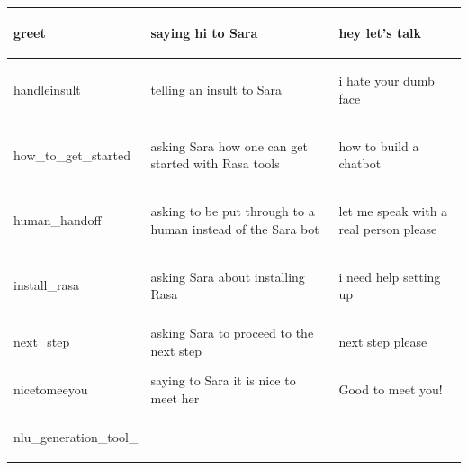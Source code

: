 \documentclass[bsc,frontabs,singlespacing,parskip,deptreport]{infthesis}
\begin{document}
{\begin{center}
\begin{longtable}{p{}|p{}|p{}}
    \hline
    \begin{spverbatim}greet\end{spverbatim} & saying hi to Sara & \begin{spverbatim}hey let's talk\end{spverbatim} \\
    \hline
    \begin{spverbatim}handleinsult\end{spverbatim} & telling an insult to Sara & \begin{spverbatim}i hate your dumb face\end{spverbatim} \\
    \hline
    \begin{spverbatim}how_to_get_started\end{spverbatim} & asking Sara how one can get started with Rasa tools & \begin{spverbatim}how to build a chatbot\end{spverbatim} \\
    \hline
    \begin{spverbatim}human_handoff\end{spverbatim} & asking to be put through to a human instead of the Sara bot & \begin{spverbatim}let me speak with a real person please\end{spverbatim} \\
    \hline
    \begin{spverbatim}install_rasa\end{spverbatim} & asking Sara about installing Rasa & \begin{spverbatim}i need help setting up\end{spverbatim} \\
    \hline
    \begin{spverbatim}next_step\end{spverbatim} & asking Sara to proceed to the next step & \begin{spverbatim}next step please\end{spverbatim} \\
    \hline
    \begin{spverbatim}nicetomeeyou\end{spverbatim} & saying to Sara it is nice to meet her & \begin{spverbatim}Good to meet you!\end{spverbatim} \\
    \hline
    \begin{spverbatim}nlu_generation_tool_

\end{spverbatim}
\end{longtable}
\end{center}}
\end{document}
